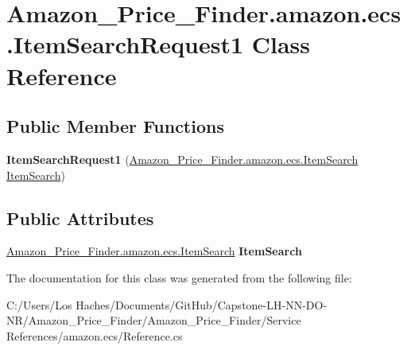 \hypertarget{class_amazon___price___finder_1_1amazon_1_1ecs_1_1_item_search_request1}{\section{Amazon\-\_\-\-Price\-\_\-\-Finder.\-amazon.\-ecs.\-Item\-Search\-Request1 Class Reference}
\label{class_amazon___price___finder_1_1amazon_1_1ecs_1_1_item_search_request1}
}
\subsection*{Public Member Functions}
\begin{DoxyCompactItemize}
\item 
\hypertarget{class_amazon___price___finder_1_1amazon_1_1ecs_1_1_item_search_request1_a6557ca54b5ceeb16523acd16c841f78d}{{\bfseries Item\-Search\-Request1} (\hyperlink{class_amazon___price___finder_1_1amazon_1_1ecs_1_1_item_search}{Amazon\-\_\-\-Price\-\_\-\-Finder.\-amazon.\-ecs.\-Item\-Search} \hyperlink{class_amazon___price___finder_1_1amazon_1_1ecs_1_1_item_search}{Item\-Search})}\label{class_amazon___price___finder_1_1amazon_1_1ecs_1_1_item_search_request1_a6557ca54b5ceeb16523acd16c841f78d}

\end{DoxyCompactItemize}
\subsection*{Public Attributes}
\begin{DoxyCompactItemize}
\item 
\hypertarget{class_amazon___price___finder_1_1amazon_1_1ecs_1_1_item_search_request1_ae02eaaba6530e99da632fb1b2137768a}{\hyperlink{class_amazon___price___finder_1_1amazon_1_1ecs_1_1_item_search}{Amazon\-\_\-\-Price\-\_\-\-Finder.\-amazon.\-ecs.\-Item\-Search} {\bfseries Item\-Search}}\label{class_amazon___price___finder_1_1amazon_1_1ecs_1_1_item_search_request1_ae02eaaba6530e99da632fb1b2137768a}

\end{DoxyCompactItemize}


The documentation for this class was generated from the following file\-:\begin{DoxyCompactItemize}
\item 
C\-:/\-Users/\-Los Haches/\-Documents/\-Git\-Hub/\-Capstone-\/\-L\-H-\/\-N\-N-\/\-D\-O-\/\-N\-R/\-Amazon\-\_\-\-Price\-\_\-\-Finder/\-Amazon\-\_\-\-Price\-\_\-\-Finder/\-Service References/amazon.\-ecs/Reference.\-cs\end{DoxyCompactItemize}
